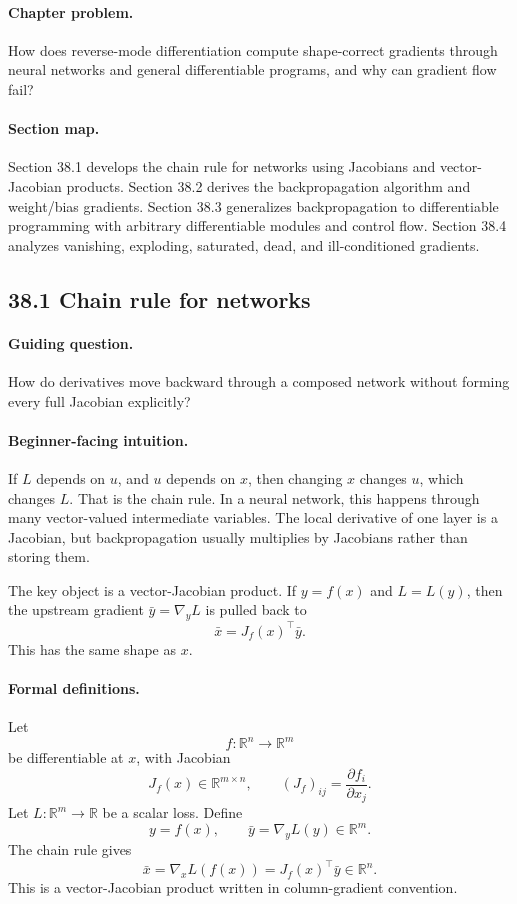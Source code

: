 \paragraph{Chapter problem.}
How does reverse-mode differentiation compute shape-correct gradients through neural networks and general differentiable programs, and why can gradient flow fail?

\paragraph{Section map.}
Section 38.1 develops the chain rule for networks using Jacobians and vector-Jacobian products. Section 38.2 derives the backpropagation algorithm and weight/bias gradients. Section 38.3 generalizes backpropagation to differentiable programming with arbitrary differentiable modules and control flow. Section 38.4 analyzes vanishing, exploding, saturated, dead, and ill-conditioned gradients.

\subsection{38.1 Chain rule for networks}

\paragraph{Guiding question.}
How do derivatives move backward through a composed network without forming every full Jacobian explicitly?

\paragraph{Beginner-facing intuition.}
If \(L\) depends on \(u\), and \(u\) depends on \(x\), then changing \(x\) changes \(u\), which changes \(L\). That is the chain rule. In a neural network, this happens through many vector-valued intermediate variables. The local derivative of one layer is a Jacobian, but backpropagation usually multiplies by Jacobians rather than storing them.

The key object is a vector-Jacobian product. If \(y=f(x)\) and \(L=L(y)\), then the upstream gradient \(\bar y=\nabla_y L\) is pulled back to
\[
\bar x=J_f(x)^\top \bar y.
\]
This has the same shape as \(x\).

\paragraph{Formal definitions.}
Let
\[
f:\mathbb R^n\to\mathbb R^m
\]
be differentiable at \(x\), with Jacobian
\[
J_f(x)\in\mathbb R^{m\times n},
\qquad
(J_f)_{ij}=\frac{\partial f_i}{\partial x_j}.
\]
Let \(L:\mathbb R^m\to\mathbb R\) be a scalar loss. Define
\[
y=f(x),\qquad \bar y=\nabla_y L(y)\in\mathbb R^m.
\]
The chain rule gives
\[
\boxed{
\bar x=\nabla_x L(f(x))=J_f(x)^\top \bar y\in\mathbb R^n.
}
\]
This is a vector-Jacobian product written in column-gradient convention.

